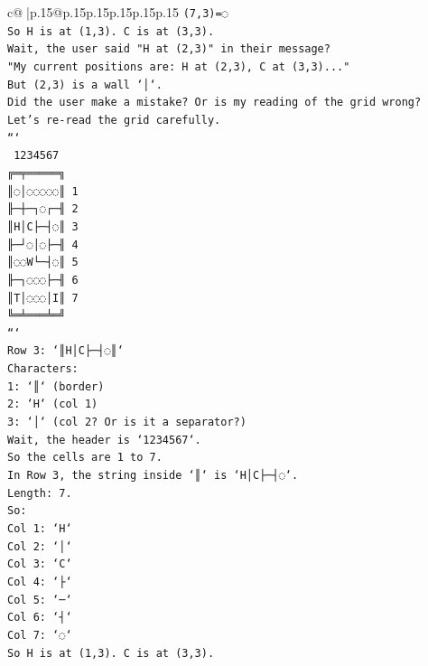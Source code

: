 \documentclass{article}
\begin{document}
{\begin{supertabular}{c@{$\;$}|p{.15\linewidth}@{}p{.15\linewidth}p{.15\linewidth}p{.15\linewidth}p{.15\linewidth}p{.15\linewidth}}
{{{\texttt{(7,3)=◌} \\
\texttt{So H is at (1,3). C is at (3,3).} \\
\texttt{Wait, the user said "H at (2,3)" in their message?} \\
\texttt{"My current positions are: H at (2,3), C at (3,3)..."} \\
\texttt{But (2,3) is a wall `│`.} \\
\texttt{Did the user make a mistake? Or is my reading of the grid wrong?} \\
\texttt{Let's re{-}read the grid carefully.} \\
\texttt{```} \\
\texttt{ 1234567} \\
\texttt{╔═╤═════╗} \\
\texttt{║◌│◌◌◌◌◌║ 1} \\
\texttt{╟─┼─┐◌┌─╢ 2} \\
\texttt{║H│C├─┤◌║ 3} \\
\texttt{╟─┘◌│◌├─╢ 4} \\
\texttt{║◌◌W└─┤◌║ 5} \\
\texttt{╟─┐◌◌◌├─╢ 6} \\
\texttt{║T│◌◌◌│I║ 7} \\
\texttt{╚═╧═══╧═╝} \\
\texttt{```} \\
\texttt{Row 3: `║H│C├─┤◌║`} \\
\texttt{Characters:} \\
\texttt{1: `║` (border)} \\
\texttt{2: `H` (col 1)} \\
\texttt{3: `│` (col 2? Or is it a separator?)} \\
\texttt{Wait, the header is `1234567`.} \\
\texttt{So the cells are 1 to 7.} \\
\texttt{In Row 3, the string inside `║` is `H│C├─┤◌`.} \\
\texttt{Length: 7.} \\
\texttt{So:} \\
\texttt{Col 1: `H`} \\
\texttt{Col 2: `│`} \\
\texttt{Col 3: `C`} \\
\texttt{Col 4: `├`} \\
\texttt{Col 5: `─`} \\
\texttt{Col 6: `┤`} \\
\texttt{Col 7: `◌`} \\
\texttt{So H is at (1,3). C is at (3,3).} \\
}}}
\end{supertabular}}
\end{document}
